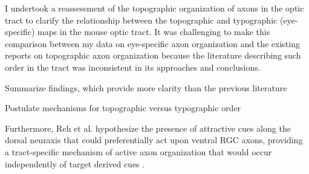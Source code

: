 I undertook a reassessment of the topographic organization of axons in the optic tract to clarify the relationship between the topographic and typographic (eye-specific) maps in the mouse optic tract.
It was challenging to make this comparison between my data on eye-specific axon organization and the existing reports on topographic axon organization because the literature describing such order in the tract was inconsistent in its approaches and conclusions.

Summarize findings, which provide more clarity than the previous literature

Postulate mechanisms for topographic versus typographic order

%
Furthermore, Reh et al. hypothesize the presence of attractive cues along the dorsal neuraxis that could preferentially act upon ventral RGC axons, providing a tract-specific mechanism of active axon organization that would occur independently of target derived cues \cite{reh1983organization}.